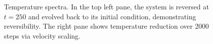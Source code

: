 \documentclass[singlepage,notitlepage,nofootinbib,11pt]{revtex4-1}
\begin{document}
\begin{figure}
  \captionsetup[subfigure]{labelformat=empty} 
  \centering
\hfill
\caption{\label{fig11} Temperature spectra. In the top left pane, the system is reversed at $t=250$ and evolved back to its initial condition, demonstrating reversibility. The right pane shows temperature reduction over 2000 steps via velocity scaling.}
\end{figure}
\end{document}
